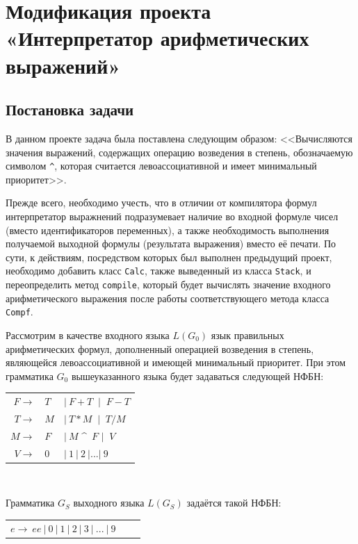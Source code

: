 \section{Модификация проекта «Интерпретатор арифметических выражений»}
\subsection*{Постановка задачи}
В данном проекте задача была поставлена следующим образом: <<Вычисляются значения выражений, содержащих операцию возведения в степень, обозначаемую символом  \verb|^|, которая считается левоассоциативной и имеет минимальный приоритет>>.

Прежде всего, необходимо учесть, что в отличии от компилятора формул интерпретатор выражнений подразумевает наличие во входной формуле чисел (вместо идентификаторов переменных), а также необходимость выполнения получаемой выходной формулы (результата выражения) вместо её печати. По сути, к действиям, посредством которых был выполнен предыдущий проект, необходимо добавить класс \verb|Calc|, также выведенный из класса \verb|Stack|, и переопределить метод \verb|compile|, который будет вычислять значение входного арифметического выражения после работы соответствующего метода класса \verb|Compf|.

Рассмотрим в качестве входного языка $L(G_0)$ язык правильных арифметических формул, дополненный операцией возведения в степень, являющейся левоассоциативной и имеющей минимальный приоритет. При этом грамматика $G_0$ вышеуказанного языка будет задаваться следующей НФБН:
\\
\begin{center}

\begin{tabular}{rll}
    $F  \rightarrow$ & $T$  &  $| \ F+T \ $  $|$  $ \ F-T $\\
    $T  \rightarrow$ & $M$  &  $| \ T*M \ $  $|$  $ \ T/M $\\
    $M  \rightarrow$ & $F$  &  $| \ M$ \^~$F$ $|$  $ \ V $\\
    $V  \rightarrow$ & $0$  &  $| \ 1  \ | \  2 \  |  ... |  \  9 $\\
\end{tabular} \\
\end{center}
Грамматика $G_S$ выходного языка $L(G_S)$ задаётся такой НФБН: \\

\begin{center}
\begin{tabular}{rll}
	$e  \rightarrow \ e e \ | \ 0 \ | \ 1 \ | \ 2 \ | \ 3 \ | \ ... \ | \ 9 $ \\
\end{tabular}
\end{center}

